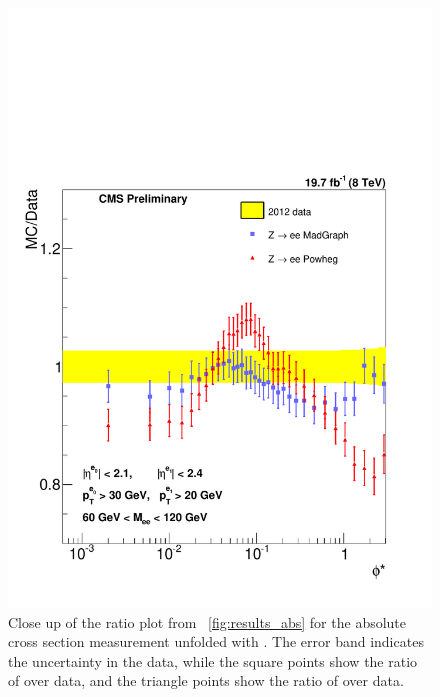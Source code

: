 \begin{figure}[!p]
    \centering
    \includegraphics[width=\textwidth]{figures/ZShape_Ratioelec_Abs_Dressed.pdf}
    \caption[
        Close up of the ratio plot from \FIG~\ref{fig:results_abs} for the
        absolute cross section measurement unfolded with \MADGRAPH.
    ]{
        Close up of the ratio plot from \FIG~\ref{fig:results_abs} for the
        absolute cross section measurement unfolded with \MADGRAPH. The error
        band indicates the uncertainty in the data, while the square points
        show the ratio of \MADGRAPH over data, and the triangle points show the
        ratio of \POWHEG over data.
    }
    \label{fig:results_ratio_abs}
\end{figure}

